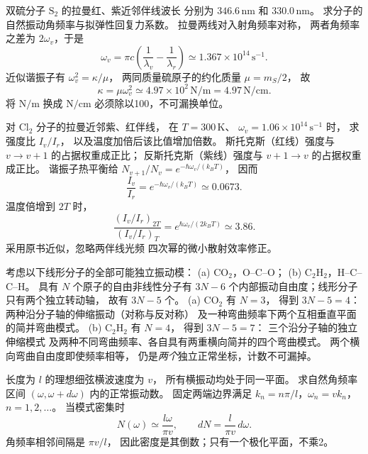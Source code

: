 双硫分子 $\mathrm{S_2}$ 的拉曼红、紫近邻伴线波长
分别为 $346.6\,\mathrm{nm}$ 和 $330.0\,\mathrm{nm}$。
求分子的自然振动角频率与拟弹性回复力系数。
\exsolution
拉曼两线对入射角频率对称，
两者角频率之差为 $2\omega_v$，于是
\[
 \boxed{\omega_v=\pi c\left(
 \frac1{\lambda_v}-\frac1{\lambda_r}\right)
 \simeq1.367\times10^{14}\,\mathrm{s^{-1}}}.
\]
近似谐振子有
$\omega_v^2=\kappa/\mu$，
两同质量硫原子的约化质量 $\mu=m_S/2$，
故
\[
 \boxed{\kappa=\mu\omega_v^2
 \simeq4.97\times10^2\,\mathrm{N/m}
 =4.97\,\mathrm{N/cm}}.
\]
\excheck 将 $\mathrm{N/m}$ 换成 $\mathrm{N/cm}$
必须除以100，不可漏换单位。

对 $\mathrm{Cl_2}$ 分子的拉曼近邻紫、红伴线，
在 $T=300\,\mathrm K$、
$\omega_v=1.06\times10^{14}\,\mathrm{s^{-1}}$ 时，
求强度比 $I_v/I_r$，
以及温度加倍后该比值增加倍数。
\exsolution
斯托克斯（红线）强度与
$v\to v+1$ 的占据权重成正比；
反斯托克斯（紫线）强度与
$v+1\to v$ 的占据权重成正比。
谐振子热平衡给
$N_{v+1}/N_v=e^{-\hbar\omega_v/(k_BT)}$，
因而
\[
 \boxed{\frac{I_v}{I_r}
 =e^{-\hbar\omega_v/(k_BT)}
 \simeq0.0673}.
\]
温度倍增到 $2T$ 时，
\[
 \boxed{\frac{(I_v/I_r)_{2T}}{(I_v/I_r)_T}
 =e^{\hbar\omega_v/(2k_BT)}\simeq3.86}.
\]
\excheck 采用原书近似，忽略两伴线光频
四次幂的微小散射效率修正。

考虑以下线形分子的全部可能独立振动模：
(a) $\mathrm{CO_2}$，O--C--O；
(b) $\mathrm{C_2H_2}$，H--C--C--H。
\exsolution
具有 $N$ 个原子的自由非线性分子有 $3N-6$
个内部振动自由度；线形分子只有两个独立转动轴，
故有 $3N-5$ 个。
(a) $\mathrm{CO_2}$ 有 $N=3$，
得到 $\boxed{3N-5=4}$：
两种沿分子轴的伸缩振动（对称与反对称）
及一种弯曲频率下两个互相垂直平面的简并弯曲模式。
(b) $\mathrm{C_2H_2}$ 有 $N=4$，
得到 $\boxed{3N-5=7}$：
三个沿分子轴的独立伸缩模式
及两种不同弯曲频率、各自具有两重横向简并的四个弯曲模式。
\excheck 两个横向弯曲自由度即使频率相等，
仍是\emph{两个}独立正常坐标，计数不可漏掉。

长度为 $l$ 的理想细弦横波速度为 $v$，
所有横振动均处于同一平面。
求自然角频率区间 $(\omega,\omega+d\omega)$
内的正常振动数。
\exsolution
固定两端边界满足
$k_n=n\pi/l$，$\omega_n=vk_n$，
$n=1,2,\ldots$。
当模式密集时
\[
 N(\omega)\simeq\frac{l\omega}{\pi v},\qquad
 \boxed{dN=\frac l{\pi v}\,d\omega}.
\]
\excheck 角频率相邻间隔是 $\pi v/l$，
因此密度是其倒数；只有一个极化平面，不乘2。

